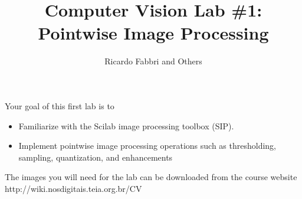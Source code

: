 \documentclass{article}
\begin{document}
\title{Computer Vision Lab \#1: Pointwise Image Processing} 

\author{Ricardo Fabbri and Others}


Your goal of this first lab is to 

\begin{itemize}
\item Familiarize with the Scilab image
processing toolbox (SIP).
\item Implement pointwise image processing operations such as thresholding,
sampling, quantization, and enhancements
\end{itemize}

The images you will need for the lab can be downloaded from the course
website
http://wiki.nosdigitais.teia.org.br/CV
\end{document}
